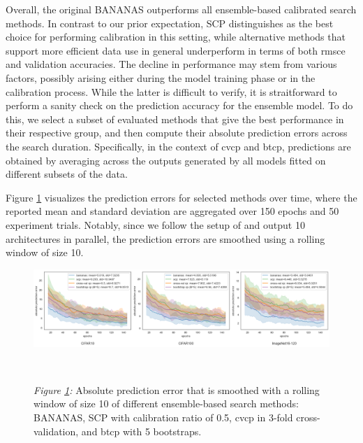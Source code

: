 \documentclass[a4paper,oneside,bibliography=totoc]{scrbook}
\begin{document}
\begin{description}[leftmargin=0cm, listparindent=\parindent]
	\item[Prediction Error Analysis:] Overall, the original BANANAS outperforms all ensemble-based calibrated search methods. In contrast to our prior expectation, SCP distinguishes as the best choice for performing calibration in this setting, while alternative methods that support more efficient data use	in general underperform in terms of both \gls{rmsce} and validation accuracies. The decline in performance may stem from various factors, possibly arising   either during the model training phase or in the calibration process. While the latter is difficult to verify, it is straitforward to perform a sanity check on the prediction accuracy for the ensemble model. To do this, we select a subset of evaluated methods that give the best performance in their respective group, and then compute their absolute prediction errors across the search duration. Specifically, in the context of \gls{cvcp} and \gls{btcp}, predictions are obtained by averaging across the outputs generated by all models fitted on different subsets of the data. 
	
	 Figure \ref{fig: pred_err} visualizes the prediction errors for selected methods over time, where the reported mean and standard deviation are aggregated over 150 epochs and 50 experiment trials. Notably, since we follow the setup of \cite{white2019bananas} and output 10 architectures in parallel, the prediction errors are smoothed using a rolling window of size 10.
	
		\vspace{0.7em}
		\begin{figure}[H]
			\centering
			\includegraphics[scale=0.39 ]{figs/prediction_error_ensemble.png}
			\label{fig: pred_err}
			\\
 			\parbox{\linewidth}{
			\vspace{0.2em}
 	  			{\small \textit{Figure \ref{fig: pred_err}:} Absolute prediction error that is smoothed with a rolling window of size 10 of different ensemble-based search methods: BANANAS, SCP with calibration ratio of 0.5, \gls{cvcp} in 3-fold cross-validation, and \gls{btcp} with 5 bootstraps.}
 	 		}	
		\end{figure}	
		\vspace{0.2em}


\end{description}
\end{document}
